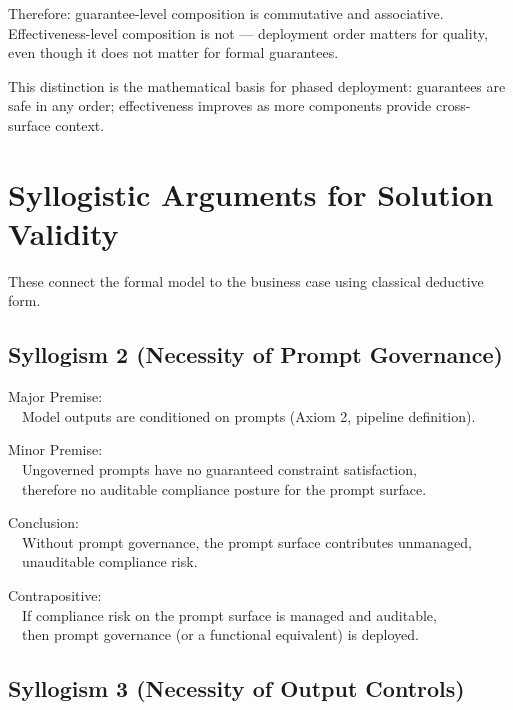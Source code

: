 \begin{cthm}
Therefore: guarantee-level composition is commutative and associative.
Effectiveness-level composition is not --- deployment order matters for quality, even though it does not matter for formal guarantees.

This distinction is the mathematical basis for phased deployment: guarantees are safe in any order; effectiveness improves as more components provide cross-surface context.

\end{cthm}






\section{Syllogistic Arguments for Solution Validity}
\label{sec:theorems-13}


These connect the formal model to the business case using classical deductive form.

\subsection{Syllogism 2 (Necessity of Prompt Governance)}


\begin{claddisp}
Major Premise:\\
~~Model outputs are conditioned on prompts (Axiom 2, pipeline definition).
\par\smallskip
Minor Premise:\\
~~Ungoverned prompts have no guaranteed constraint satisfaction,\\
~~therefore no auditable compliance posture for the prompt surface.
\par\smallskip
Conclusion:\\
~~Without prompt governance, the prompt surface contributes unmanaged,\\
~~unauditable compliance risk.
\par\smallskip
Contrapositive:\\
~~If compliance risk on the prompt surface is managed and auditable,\\
~~then prompt governance (or a functional equivalent) is deployed.
\end{claddisp}


\subsection{Syllogism 3 (Necessity of Output Controls)}


